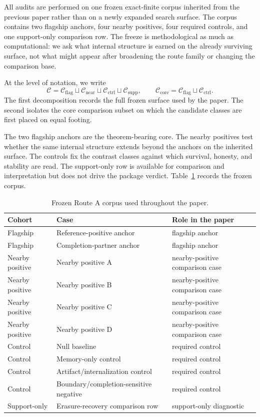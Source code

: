 \documentclass[11pt]{article}
\theoremstyle{definition}
\begin{document}
All audits are performed on one frozen exact-finite corpus inherited from the previous paper rather than on a newly expanded search surface. The corpus contains two flagship anchors, four nearby positives, four required controls, and one support-only comparison row. The freeze is methodological as much as computational: we ask what internal structure is earned on the already surviving surface, not what might appear after broadening the route family or changing the comparison base.

At the level of notation, we write
\[
\mathcal C
  = \mathcal C_{\mathrm{flag}}
    \sqcup \mathcal C_{\mathrm{near}}
    \sqcup \mathcal C_{\mathrm{ctrl}}
    \sqcup \mathcal C_{\mathrm{supp}},
\qquad
\mathcal C_{\mathrm{core}}
  = \mathcal C_{\mathrm{flag}}
    \sqcup \mathcal C_{\mathrm{ctrl}}.
\]
The first decomposition records the full frozen surface used by the paper. The second isolates the core comparison subset on which the candidate classes are first placed on equal footing.

The two flagship anchors are the theorem-bearing core. The nearby positives test whether the same internal structure extends beyond the anchors on the inherited surface. The controls fix the contrast classes against which survival, honesty, and stability are read. The support-only row is available for comparison and interpretation but does not drive the package verdict. Table~\ref{tab:frozen-corpus} records the frozen corpus.

\begin{table}[t]
\centering
\caption{Frozen Route A corpus used throughout the paper.}
\label{tab:frozen-corpus}
\begin{tabularx}{\linewidth}{@{}l l >{\raggedright\arraybackslash}X@{}}
\toprule
Cohort & Case & Role in the paper \\
\midrule
Flagship & Reference-positive anchor & flagship anchor \\
Flagship & Completion-partner anchor & flagship anchor \\
Nearby positive & Nearby positive A & nearby-positive comparison case \\
Nearby positive & Nearby positive B & nearby-positive comparison case \\
Nearby positive & Nearby positive C & nearby-positive comparison case \\
Nearby positive & Nearby positive D & nearby-positive comparison case \\
Control & Null baseline & required control \\
Control & Memory-only control & required control \\
Control & Artifact/internalization control & required control \\
Control & Boundary/completion-sensitive negative & required control \\
Support-only & Erasure-recovery comparison row & support-only diagnostic \\
\bottomrule
\end{tabularx}
\end{table}
\end{document}
